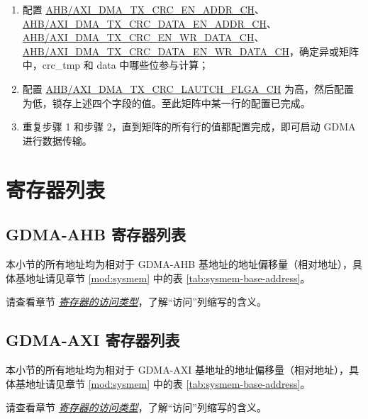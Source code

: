 \documentclass[main\_\_CN.tex]{subfiles}
\begin{document}
\begin{enumerate}
\item 配置 \hyperref[fielddesc:AHBDMATXCRCENADDRCHN]{AHB/AXI\_DMA\_TX\_CRC\_EN\_ADDR\_CH}、\hyperref[fielddesc:AHBDMATXCRCDATAENADDRCHN]{AHB/AXI\_DMA\_TX\_CRC\_DATA\_EN\_ADDR\_CH}、\hyperref[fielddesc:AHBDMATXCRCENWRDATACHN]{AHB/AXI\_DMA\_TX\_CRC\_EN\_WR\_DATA\_CH}、\hyperref[fielddesc:AHBDMATXCRCDATAENWRDATACHN]{AHB/AXI\_DMA\_TX\_CRC\_DATA\_EN\_WR\_DATA\_CH}，确定异或矩阵中，crc\_tmp 和 data 中哪些位参与计算；
\item
配置 \hyperref[fielddesc:AHBDMATXCRCLAUTCHFLGACHN]{AHB/AXI\_DMA\_TX\_CRC\_LAUTCH\_FLGA\_CH} 为高，然后配置为低，锁存上述四个字段的值。至此矩阵中某一行的配置已完成。
\item 重复步骤 1 和步骤 2，直到矩阵的所有行的值都配置完成，即可启动 GDMA 进行数据传输。
\end{enumerate}




\newpage
\begin{landscape}
\hypertarget{dma-reg-summ}{}
\section{寄存器列表}
\label{sec:dma-reg-summ}

\subsection{GDMA-AHB 寄存器列表}

本小节的所有地址均为相对于 GDMA-AHB 基地址的地址偏移量（相对地址），具体基地址请见章节 \ref{mod:sysmem} \textit{} 中的表 \ref{tab:sysmem-base-address}。

请查看章节 \hyperref[glossary-access-types]{\textit{寄存器的访问类型}}，了解“访问”列缩写的含义。



\subsection{GDMA-AXI 寄存器列表}

本小节的所有地址均为相对于 GDMA-AXI 基地址的地址偏移量（相对地址），具体基地址请见章节 \ref{mod:sysmem} \textit{} 中的表 \ref{tab:sysmem-base-address}。

请查看章节 \hyperref[glossary-access-types]{\textit{寄存器的访问类型}}，了解“访问”列缩写的含义。


\end{landscape}
\end{document}

